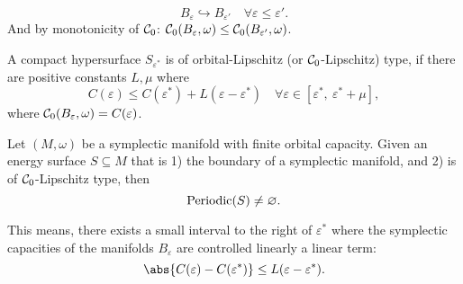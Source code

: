 \documentclass[../main-v2-manifolds.tex]{subfiles}
\begin{document}
\[
    B_{\varepsilon}\hookrightarrow B_{\varepsilon'}\quad\forall\varepsilon\leq\varepsilon'.
\]
And by monotonicity of $\mathcal{C}_0$: $\mathcal{C}_0(B_{\varepsilon},\omega)\leq\mathcal{C}_{0}(B_{\varepsilon'},\omega)$.
\begin{definition}
    A compact hypersurface $S_{\varepsilon^*}$ is of orbital-Lipschitz (or $\mathcal{C}_0$-Lipschitz) type, if there are positive constants $L, \mu$ where
    \[
        C(\varepsilon)\leq C(\varepsilon^*) + L(\varepsilon - \varepsilon^*)\quad\forall \varepsilon \in [\varepsilon^*,\: \varepsilon^* +\mu],
    \]
    where $\mathcal{C}_0(B_{\varepsilon},\omega) = C(\varepsilon)$.
\end{definition}
\begin{wts}
    Let $(M,\omega)$ be a symplectic manifold with finite orbital capacity. Given an energy surface $S\subseteq M$ that is 1) the boundary of a symplectic manifold, and 2) is of $\mathcal{C}_0$-Lipschitz type, then
    \[
        \mathrm{Periodic}(S)\neq \varnothing.
    \]
\end{wts}
\begin{remark}
    This means, there exists a small interval to the right of $\varepsilon^*$ where the symplectic capacities of the manifolds $B_{\varepsilon}$ are controlled linearly a linear term:
    \[
        \abs{C(\varepsilon) - C(\varepsilon^*)}\leq L(\varepsilon - \varepsilon^*).
    \]
\end{remark}
%
%
%
\ifSubfilesClassLoaded{%
}{}
\end{document}
